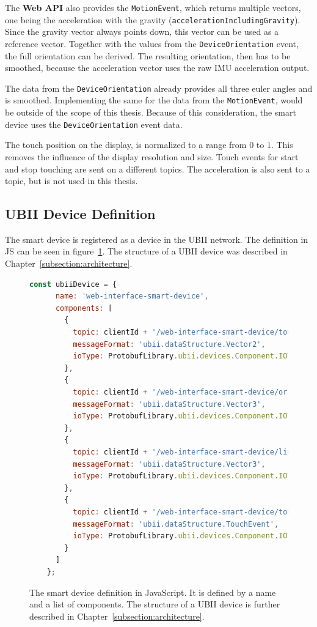 The \textbf{Web API} also provides the \lstinline{MotionEvent}, which returns multiple vectors, one being the acceleration with the gravity (\lstinline{accelerationIncludingGravity}). Since the gravity vector always points down, this vector can be used as a reference vector. Together with the values from the \lstinline{DeviceOrientation} event, the full orientation can be derived. The resulting orientation, then has to be smoothed, because the acceleration vector uses the raw \ac{IMU} acceleration output. 

The data from the \lstinline{DeviceOrientation} already provides all three euler angles and is smoothed. Implementing the same for the data from the \lstinline{MotionEvent}, would be outside of the scope of this thesis. Because of this consideration, the smart device uses the \lstinline{DeviceOrientation} event data.

The touch position on the display, is normalized to a range from \(0\) to \(1\). This removes the influence of the display resolution and size. Touch events for start and stop touching are sent on a different topics. The acceleration is also sent to a topic, but is not used in this thesis.


\subsection{UBII Device Definition}\label{subsection:ubii-device-definition}

The smart device is registered as a device in the \ac{UBII} network. The definition in \ac{JS} can be seen in figure~\ref{fig:ubii-device-registration}. The structure of a \ac{UBII} device was described in Chapter~\ref{subsection:architecture}. 

\begin{figure}[H]
  \begin{lstlisting}[language=JavaScript]
    const ubiiDevice = {
      name: 'web-interface-smart-device',
      components: [
        {
          topic: clientId + '/web-interface-smart-device/touch_position',
          messageFormat: 'ubii.dataStructure.Vector2',
          ioType: ProtobufLibrary.ubii.devices.Component.IOType.INPUT
        },
        {
          topic: clientId + '/web-interface-smart-device/orientation',
          messageFormat: 'ubii.dataStructure.Vector3',
          ioType: ProtobufLibrary.ubii.devices.Component.IOType.INPUT
        },
        {
          topic: clientId + '/web-interface-smart-device/linear_acceleration',
          messageFormat: 'ubii.dataStructure.Vector3',
          ioType: ProtobufLibrary.ubii.devices.Component.IOType.INPUT
        },
        {
          topic: clientId + '/web-interface-smart-device/touch_events',
          messageFormat: 'ubii.dataStructure.TouchEvent',
          ioType: ProtobufLibrary.ubii.devices.Component.IOType.INPUT
        }
      ]
    };
  \end{lstlisting}
  \caption[The Smart Device definition.]{The smart device definition in JavaScript. It is defined by a name and a list of components. The structure of a \ac{UBII} device is further described in Chapter~\ref{subsection:architecture}.}\label{fig:ubii-device-registration}
\end{figure}

